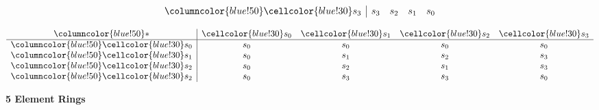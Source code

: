 \documentclass{article}
\begin{document}
\begin{center}
\begin{minipage}{0.23\textwidth}
\[\begin{array}{>{\columncolor{blue!50}}c|cccc}
    \cellcolor{blue!30}s_3 & s_3 & s_2 & s_1 & s_0 \\
    \end{array}
    \]
\end{minipage}%
\hfill
\begin{minipage}{0.23\textwidth}
    \centering
    \renewcommand{\arraystretch}{1.5} 
    \[
    \begin{array}{>{\columncolor{blue!50}}c|cccc}
    * & \cellcolor{blue!30}s_0 & \cellcolor{blue!30}s_1 & \cellcolor{blue!30}s_2 & \cellcolor{blue!30}s_3 \\ \hline
    \cellcolor{blue!30}s_0 & s_0 & s_0 & s_0 & s_0 \\
    \cellcolor{blue!30}s_1 & s_0 & s_1 & s_2 & s_3 \\
    \cellcolor{blue!30}s_2 & s_0 & s_2 & s_1 & s_3 \\
    \cellcolor{blue!30}s_2 & s_0 & s_3 & s_3 & s_0 \\
    \end{array}
    \]
\end{minipage}
\end{center}

\vspace{0.75cm}
\begin{center}
\textbf{5 Element Rings}
\end{center}
\end{document}
